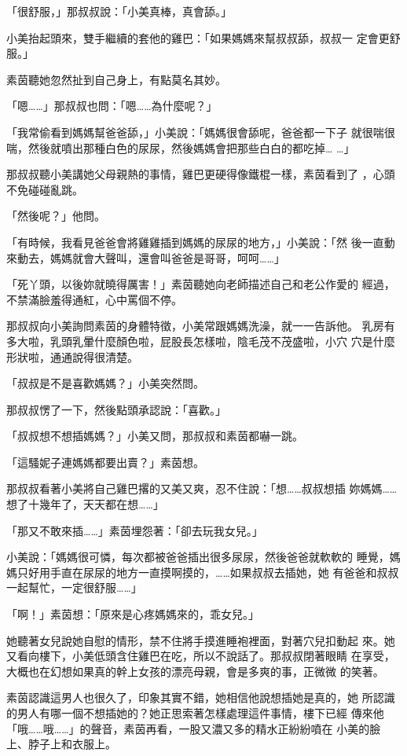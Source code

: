 「很舒服，」那叔叔說：「小美真棒，真會舔。」

小美抬起頭來，雙手繼續的套他的雞巴：「如果媽媽來幫叔叔舔，叔叔一
定會更舒服。」

素茵聽她忽然扯到自己身上，有點莫名其妙。

「嗯……」那叔叔也問：「嗯……為什麼呢？」

「我常偷看到媽媽幫爸爸舔，」小美說：「媽媽很會舔呢，爸爸都一下子
就很喘很喘，然後就噴出那種白色的尿尿，然後媽媽會把那些白白的都吃掉…
…」

那叔叔聽小美講她父母親熱的事情，雞巴更硬得像鐵棍一樣，素茵看到了
，心頭不免碰碰亂跳。

「然後呢？」他問。

「有時候，我看見爸爸會將雞雞插到媽媽的尿尿的地方，」小美說：「然
後一直動來動去，媽媽就會大聲叫，還會叫爸爸是哥哥，呵呵……」

「死丫頭，以後妳就曉得厲害！」素茵聽她向老師描述自己和老公作愛的
經過，不禁滿臉羞得通紅，心中罵個不停。

那叔叔向小美詢問素茵的身體特徵，小美常跟媽媽洗澡，就一一告訴他。
乳房有多大啦，乳頭乳暈什麼顏色啦，屁股長怎樣啦，陰毛茂不茂盛啦，小穴
穴是什麼形狀啦，通通說得很清楚。

「叔叔是不是喜歡媽媽？」小美突然問。

那叔叔愣了一下，然後點頭承認說：「喜歡。」

「叔叔想不想插媽媽？」小美又問，那叔叔和素茵都嚇一跳。

「這騷妮子連媽媽都要出賣？」素茵想。

那叔叔看著小美將自己雞巴撂的又美又爽，忍不住說：「想……叔叔想插
妳媽媽……想了十幾年了，天天都在想……」

「那又不敢來插……」素茵埋怨著：「卻去玩我女兒。」

小美說：「媽媽很可憐，每次都被爸爸插出很多尿尿，然後爸爸就軟軟的
睡覺，媽媽只好用手直在尿尿的地方一直摸啊摸的，……如果叔叔去插她，她
有爸爸和叔叔一起幫忙，一定很舒服……」

「啊！」素茵想：「原來是心疼媽媽來的，乖女兒。」

她聽著女兒說她自慰的情形，禁不住將手摸進睡袍裡面，對著穴兒扣動起
來。她又看向樓下，小美低頭含住雞巴在吃，所以不說話了。那叔叔閉著眼睛
在享受，大概也在幻想如果真的幹上女孩的漂亮母親，會是多爽的事，正微微
的笑著。

素茵認識這男人也很久了，印象其實不錯，她相信他說想插她是真的，她
所認識的男人有哪一個不想插她的？她正思索著怎樣處理這件事情，樓下已經
傳來他「哦……哦……」的聲音，素茵再看，一股又濃又多的精水正紛紛噴在
小美的臉上、脖子上和衣服上。

